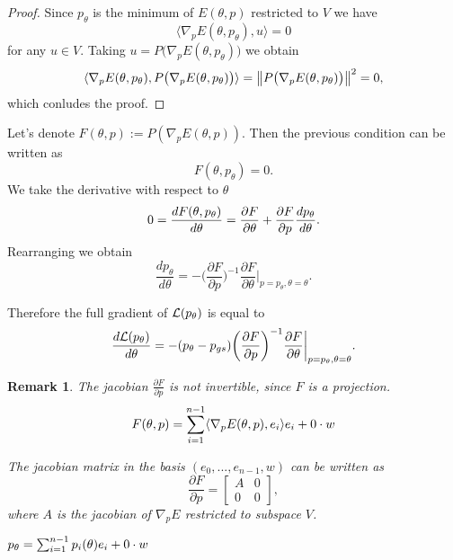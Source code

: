 \documentclass[a4paper,10pt]{report}
\newtheorem{remark}{Remark}
\begin{document}
\begin{proof}
  Since $p_\theta$ is the minimum of $E(\theta,p)$ restricted to $V$ we have \[\langle \nabla_p E(\theta,p_{\theta}), u \rangle = 0\] for any $u\in V$. Taking $u = P\big( \nabla_p E(\theta,p_\theta)\big)$ we obtain
  \[\langle \nabla_p E(\theta,p_{\theta}), P\big( \nabla_p E(\theta,p_\theta)\big) \rangle = \left\|P\big( \nabla_p E(\theta,p_\theta)\big)\right\|^2=0,\]
  which conludes the proof.
\end{proof}

Let's denote $F(\theta,p) :=P (\nabla_p E(\theta,p)).$ Then the previous condition can be written as
\begin{equation}
 F(\theta,p_\theta) = 0.
\end{equation}
We take the derivative with respect to $\theta$
\begin{equation}
0=\frac{dF(\theta, p_\theta)}{d \theta} = \frac{\partial F}{\partial \theta} + \frac{\partial F}{\partial p} \frac{dp_\theta}{d \theta}.
\end{equation}
Rearranging we obtain
\begin{equation}
 \frac{d p_\theta}{d\theta} = - \bigg(\frac{\partial F}{\partial p}\bigg)^{-1}  \frac{\partial F}{\partial \theta}\bigg|_{p=p_\theta, \theta=\theta}.
\end{equation}

Therefore the full gradient of $\mathcal{L}(p_\theta)$ is equal to
\begin{equation}
 \frac{d\mathcal{L}(p_\theta)}{d \theta} = - (p_\theta - p_{gs})\bigg(\frac{\partial F}{\partial p}\bigg)^{-1}  \frac{\partial F}{\partial \theta}\bigg|_{p=p_\theta, \theta=\theta}.
\end{equation}
\begin{remark}
 The jacobian $\frac{\partial F}{\partial p}$ is not invertible, since $F$ is a projection.
 \begin{equation}
  F(\theta, p) = \sum_{i=1}^{n-1} \langle \nabla_p E(\theta, p), e_i \rangle e_i +  0 \cdot w
 \end{equation}

 The jacobian matrix in the basis $(e_0,...,e_{n-1},w)$ can be written as \begin{equation}
                      \frac{\partial F}{\partial p} =\begin{bmatrix}
A & 0 \\
0 & 0
\end{bmatrix},
                     \end{equation}
where $A$ is the jacobian of $\nabla_p E$ restricted to subspace $V$.



 $p_\theta = \sum_{i=1}^{n-1}p_i(\theta) e_i +  0 \cdot w$
\end{remark}
\end{document}

